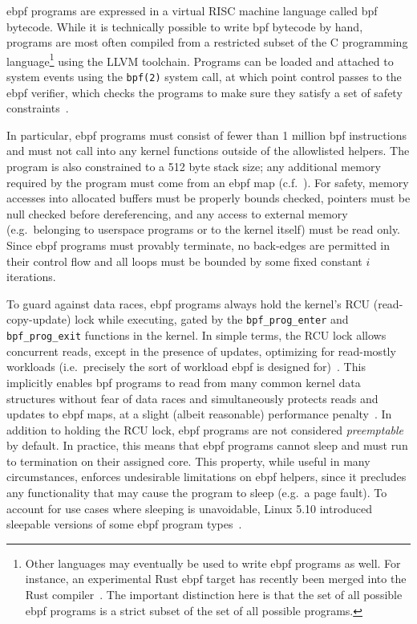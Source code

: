 \documentclass[
  fontsize=12pt,
  titlepage=firstiscover,
  paper=letter,
oneside,
  cleardoublepage=plain,
  parskip=half-,
  DIV=10,
  parindent,
  appendixprefix,
  chapterprefix,
  listof=totoc,
]{scrbook}
\begin{document}
\gls{ebpf} programs are expressed in a virtual RISC machine language called \gls{bpf}
bytecode.  While it is technically possible to write \gls{bpf} bytecode by hand, programs
are most often compiled from a restricted subset of the C programming
language\footnote{Other languages may eventually be used to write \gls{ebpf} programs as
well.  For instance, an experimental Rust \gls{ebpf} target has recently been merged into
the Rust compiler~\cite{decina2021_bpf_rust}. The important distinction here is that the
set of all possible \gls{ebpf} programs is a strict subset of the set of all possible
programs.} using the LLVM toolchain. Programs can be loaded and attached to system events
using the \texttt{bpf(2)} system call, at which point control passes to the \gls{ebpf}
verifier, which checks the programs to make sure they satisfy a set of safety
constraints~\cite{starovoitov2014_ebpf, gregg2019_bpf}.

In particular, \gls{ebpf} programs must consist of fewer than 1 million \gls{bpf}
instructions and must not call into any kernel functions outside of the allowlisted
helpers. The program is also constrained to a 512 byte stack size; any additional memory
required by the program must come from an \gls{ebpf} map (c.f.\ ). For
safety, memory accesses into allocated buffers must be properly bounds checked, pointers
must be null checked before dereferencing, and any access to external memory
(e.g.\ belonging to userspace programs or to the kernel itself) must be read only. Since
\gls{ebpf} programs must provably terminate, no back-edges are permitted in their control
flow and all loops must be bounded by some fixed constant $i$ iterations.

To guard against data races, \gls{ebpf} programs always hold the kernel's RCU (read-copy-update)
lock while executing, gated by the \texttt{bpf\_prog\_enter} and \texttt{bpf\_prog\_exit}
functions in the kernel. In simple terms, the RCU lock allows concurrent reads, except in
the presence of updates, optimizing for read-mostly workloads (i.e.\ precisely the sort of
workload \gls{ebpf} is designed for)~\cite{mckenney2007_rcu}. This implicitly enables \gls{bpf}
programs to read from many common kernel data structures without fear of data races and
simultaneously protects reads and updates to \gls{ebpf} maps, at a slight (albeit reasonable)
performance penalty~\cite{mckenney2007_rcu}. In addition to holding the RCU lock, \gls{ebpf}
programs are not considered \textit{preemptable} by default. In practice, this means that
\gls{ebpf} programs cannot sleep and must run to termination on their assigned core. This
property, while useful in many circumstances, enforces undesirable limitations on \gls{ebpf}
helpers, since it precludes any functionality that may cause the program to sleep (e.g.\ a
page fault). To account for use cases where sleeping is unavoidable, Linux 5.10 introduced
sleepable versions of some \gls{ebpf} program types~\cite{starovoitov2020_sleepable}.
\end{document}
